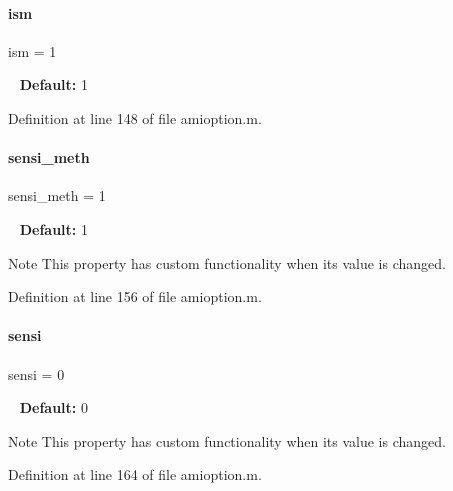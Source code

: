 \mbox{\label{classamioption_aada9d6834569ad5c542cb8dc6b26ea46}} 
\paragraph{\texorpdfstring{ism}{ism}}
{\footnotesize\ttfamily ism = 1}

~\newline
{\bfseries Default\+:} 1 

Definition at line 148 of file amioption.\+m.

\mbox{\label{classamioption_ab31e219eb42bc06629c3f247a01b9906}} 
\paragraph{\texorpdfstring{sensi\+\_\+meth}{sensi\_meth}}
{\footnotesize\ttfamily sensi\+\_\+meth = 1}

~\newline
{\bfseries Default\+:} 1

\begin{DoxyNote}{Note}
This property has custom functionality when its value is changed. 
\end{DoxyNote}


Definition at line 156 of file amioption.\+m.

\mbox{\label{classamioption_a7dd31d33463c5a709251bcef0eccaa36}} 
\paragraph{\texorpdfstring{sensi}{sensi}}
{\footnotesize\ttfamily sensi = 0}

~\newline
{\bfseries Default\+:} 0

\begin{DoxyNote}{Note}
This property has custom functionality when its value is changed. 
\end{DoxyNote}


Definition at line 164 of file amioption.\+m.

\mbox{\label{classamioption_a85519d27e7231ac625e5b2deee92165a}} 
